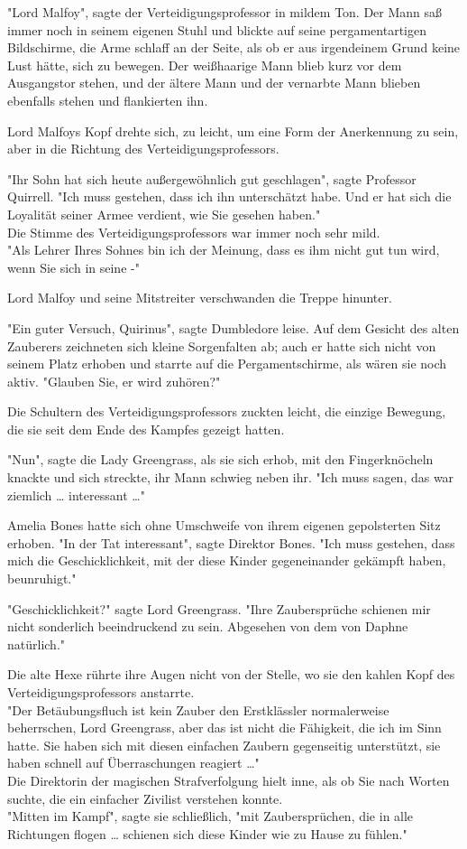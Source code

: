 {"Lord Malfoy", sagte der Verteidigungsprofessor in mildem Ton. Der Mann saß immer noch in seinem eigenen Stuhl und blickte auf seine pergamentartigen Bildschirme, die Arme schlaff an der Seite, als ob er aus irgendeinem Grund keine Lust hätte, sich zu bewegen. Der weißhaarige Mann blieb kurz vor dem Ausgangstor stehen, und der ältere Mann und der vernarbte Mann blieben ebenfalls stehen und flankierten ihn.

Lord Malfoys Kopf drehte sich, zu leicht, um eine Form der Anerkennung zu sein, aber in die Richtung des Verteidigungsprofessors.

"Ihr Sohn hat sich heute außergewöhnlich gut geschlagen", sagte Professor Quirrell. "Ich muss gestehen, dass ich ihn unterschätzt habe. Und er hat sich die Loyalität seiner Armee verdient, wie Sie gesehen haben."\\ Die Stimme des Verteidigungsprofessors war immer noch sehr mild.\\ "Als Lehrer Ihres Sohnes bin ich der Meinung, dass es ihm nicht gut tun wird, wenn Sie sich in seine -"

Lord Malfoy und seine Mitstreiter verschwanden die Treppe hinunter.

"Ein guter Versuch, Quirinus", sagte Dumbledore leise. Auf dem Gesicht des alten Zauberers zeichneten sich kleine Sorgenfalten ab; auch er hatte sich nicht von seinem Platz erhoben und starrte auf die Pergamentschirme, als wären sie noch aktiv. "Glauben Sie, er wird zuhören?"

Die Schultern des Verteidigungsprofessors zuckten leicht, die einzige Bewegung, die sie seit dem Ende des Kampfes gezeigt hatten.

"Nun", sagte die Lady Greengrass, als sie sich erhob, mit den Fingerknöcheln knackte und sich streckte, ihr Mann schwieg neben ihr. "Ich muss sagen, das war ziemlich … interessant …"

Amelia Bones hatte sich ohne Umschweife von ihrem eigenen gepolsterten Sitz erhoben. "In der Tat interessant", sagte Direktor Bones. "Ich muss gestehen, dass mich die Geschicklichkeit, mit der diese Kinder gegeneinander gekämpft haben, beunruhigt."

"Geschicklichkeit?" sagte Lord Greengrass. "Ihre Zaubersprüche schienen mir nicht sonderlich beeindruckend zu sein. Abgesehen von dem von Daphne natürlich."

Die alte Hexe rührte ihre Augen nicht von der Stelle, wo sie den kahlen Kopf des Verteidigungsprofessors anstarrte.\\ "Der Betäubungsfluch ist kein Zauber den Erstklässler normalerweise beherrschen, Lord Greengrass, aber das ist nicht die Fähigkeit, die ich im Sinn hatte. Sie haben sich mit diesen einfachen Zaubern gegenseitig unterstützt, sie haben schnell auf Überraschungen reagiert …"\\ Die Direktorin der magischen Strafverfolgung hielt inne, als ob Sie nach Worten suchte, die ein einfacher Zivilist verstehen konnte.\\ "Mitten im Kampf", sagte sie schließlich, "mit Zaubersprüchen, die in alle Richtungen flogen … schienen sich diese Kinder wie zu Hause zu fühlen."

}
